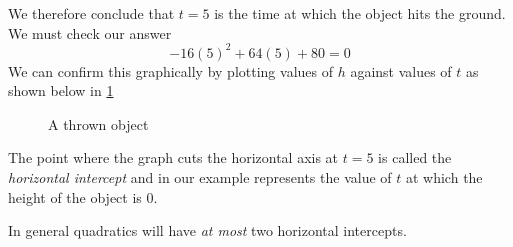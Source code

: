 \begin{myProof}
	We therefore conclude that $t=5$ is the time at which the object hits the ground. We must check our answer
	\[
		-16(5)^2+64(5)+80=0
	\]
	We can confirm this graphically by plotting values of $h$ against values of $t$ as shown below in 
	\cref{fig:thrownobject}
				
	\begin{figure}[!h]
		\centering
		\caption{A thrown object}
		\label{fig:thrownobject}
	\end{figure}
	\FloatBarrier
				
	The \gls{point} where the graph cuts the horizontal axis at $t=5$ is called the {\em horizontal \gls{intercept}} and in our example
	represents the value of $t$ at which the height of the object is $0$. 
				
	In general quadratics will have {\em at most} two horizontal intercepts.
\end{myProof}
